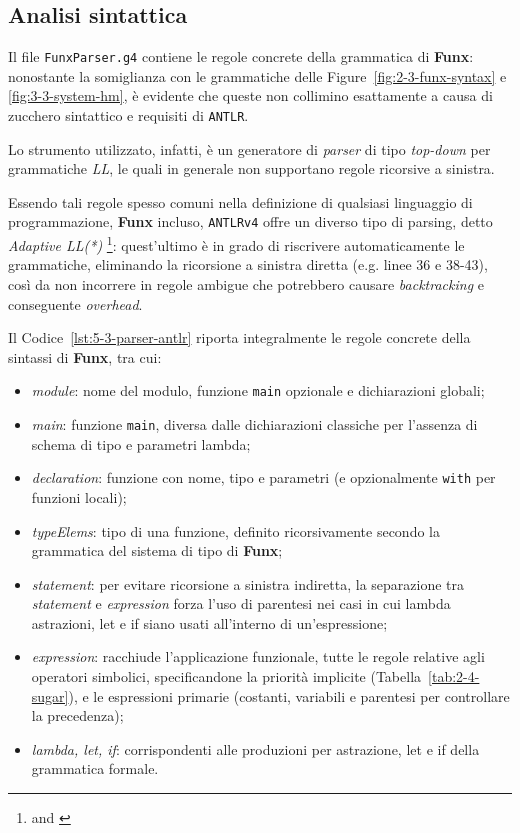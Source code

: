 \subsection{Analisi sintattica}
\label{sec:5-3-syntactic-analysis}

Il file \texttt{FunxParser.g4} contiene le regole concrete della grammatica di \textbf{Funx}:
nonostante la somiglianza con le grammatiche delle Figure~\ref{fig:2-3-funx-syntax} e \ref{fig:3-3-system-hm},
è evidente che queste non collimino esattamente a causa di zucchero sintattico e requisiti di \texttt{ANTLR}.

\noindent Lo strumento utilizzato, infatti, è un generatore di \textit{parser} di tipo \textit{top-down}
per grammatiche \textit{LL}, le quali in generale non supportano regole ricorsive a sinistra.

\noindent Essendo tali regole spesso comuni nella definizione di qualsiasi linguaggio di programmazione,
\textbf{Funx} incluso, \texttt{ANTLRv4} offre un diverso tipo di parsing, detto \textit{Adaptive LL(*)}%
\footnote{ \cite{Parr-2011-FoundationANTLR}
    and  \cite{Parr-2014-AdaptiveLL}}:
quest'ultimo è in grado di riscrivere automaticamente le grammatiche, eliminando la ricorsione a sinistra diretta (e.g. linee 36 e 38-43),
così da non incorrere in regole ambigue che potrebbero causare \textit{backtracking} e conseguente \textit{overhead}.

\noindent Il Codice~\ref{lst:5-3-parser-antlr} riporta integralmente le regole concrete della sintassi di \textbf{Funx}, tra cui:
\begin{itemize}
    \item \textit{module}: nome del modulo, funzione \texttt{main} opzionale e dichiarazioni globali;
    \item \textit{main}: funzione \texttt{main}, diversa dalle dichiarazioni classiche per l'assenza di schema di tipo e parametri lambda;
    \item \textit{declaration}: funzione con nome, tipo e parametri (e opzionalmente \texttt{with} per funzioni locali);
    \item \textit{typeElems}: tipo di una funzione, definito ricorsivamente secondo la grammatica del sistema di tipo di \textbf{Funx};
    \item \textit{statement}: per evitare ricorsione a sinistra indiretta, la separazione tra \textit{statement} e \textit{expression}
          forza l'uso di parentesi nei casi in cui lambda astrazioni, let e if siano usati all'interno di un'espressione;
    \item \textit{expression}: racchiude l'applicazione funzionale, tutte le regole relative agli operatori simbolici,
          specificandone la priorità implicite (Tabella~\ref{tab:2-4-sugar}), e le espressioni primarie
          (costanti, variabili e parentesi per controllare la precedenza);
    \item \textit{lambda, let, if}: corrispondenti alle produzioni per astrazione, let e if della grammatica formale.
\end{itemize}


